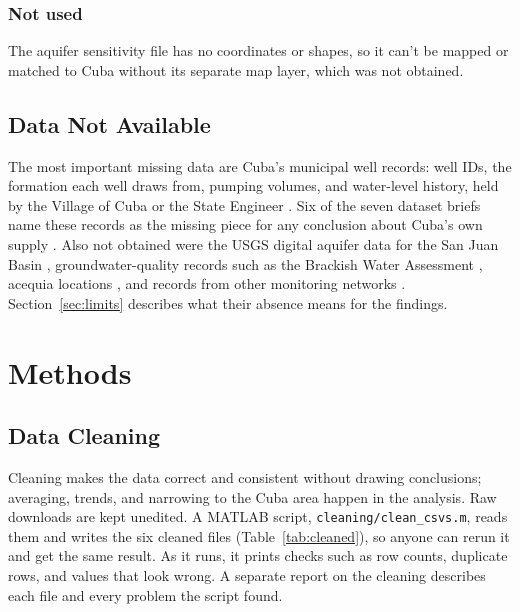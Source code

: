 \documentclass[10pt,twocolumn,letterpaper]{article}
\begin{document}
\subsubsection{Not used}
The aquifer sensitivity file \citep{nmwd_sensitivity} has no coordinates or shapes, so it can't be
mapped or matched to Cuba without its separate map layer, which was not obtained.

\subsection{Data Not Available}
The most important missing data are Cuba's municipal well records: well IDs, the formation each
well draws from, pumping volumes, and water-level history, held by the Village of Cuba or the
State Engineer \citep{nmose}. Six of the seven dataset briefs name these records as the missing
piece for any conclusion about Cuba's own supply
\citep{gonzales_brief1,gonzales_brief2,gonzales_brief4,gonzales_brief5,gonzales_brief6,gonzales_brief7}. Also not obtained were the USGS digital aquifer data for the San Juan Basin
\citep{usgs_rasa_sjb}, groundwater-quality records such as the Brackish Water Assessment
\citep{nmbg_bwa}, acequia locations \citep{isc_acequias}, and records from other monitoring
networks \citep{ngwmn,cgmn}. Section~\ref{sec:limits} describes what their absence means for the
findings.

\section{Methods}\label{sec:methods}
\subsection{Data Cleaning}
Cleaning makes the data correct and consistent without drawing conclusions; averaging, trends,
and narrowing to the Cuba area happen in the analysis. Raw downloads are kept unedited. A MATLAB
script, \texttt{cleaning/clean\_csvs.m}, reads them and writes the six cleaned files
(Table~\ref{tab:cleaned}), so anyone can rerun it and get the same result. As it runs, it prints
checks such as row counts, duplicate rows, and values that look wrong. A separate report on the
cleaning \citep{wauneka2026cleaning} describes each file and every problem the script found.
\end{document}
